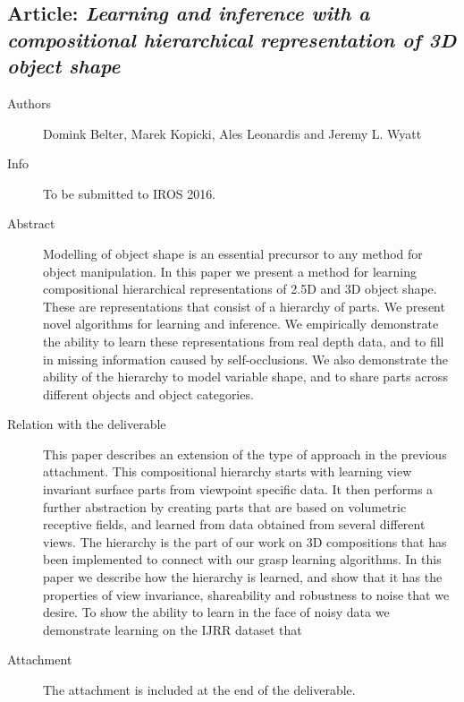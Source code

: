 \documentclass[a4paper,11pt,pdf]{pacmanreport}
\begin{document}
\subsection{Article: \em Learning and inference with a compositional hierarchical representation
of 3D object shape}
\begin{description}
    \item[Authors] Domink Belter, Marek Kopicki, Ales Leonardis and Jeremy L. Wyatt
    \item[Info] To be submitted to IROS 2016. %
    \item[Abstract] Modelling of object shape is an essential precursor to any method for object manipulation. In this paper
we present a method for learning compositional hierarchical representations of 2.5D and 3D object shape. These are representations
that consist of a hierarchy of parts. We present novel algorithms for learning and inference. We empirically demonstrate the ability to learn these representations from real
depth data, and to fill in missing information caused by self-occlusions. We also demonstrate the ability of the hierarchy to model variable shape, and to share parts across different
objects and object categories.
    \item [Relation with the deliverable] This paper describes an extension of the type of approach in the previous attachment. This compositional hierarchy starts with learning view invariant surface parts from viewpoint specific data. It then performs a further abstraction by creating parts that are based on volumetric receptive fields, and learned from data obtained from several different views. The hierarchy is the part of our work on 3D compositions that has been implemented to connect with our grasp learning algorithms. In this paper we describe how the hierarchy is learned, and show that it has the properties of view invariance, shareability and robustness to noise that we desire. To show the ability to learn in the face of noisy data we demonstrate learning on the IJRR dataset that 
    \item[Attachment] The attachment is included at the end of the deliverable. %
\end{description}
\newpage
\end{document}

